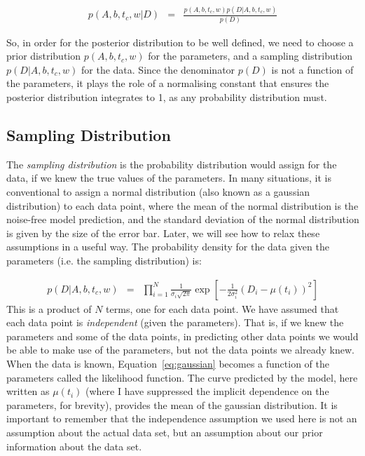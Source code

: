 \begin{eqnarray}
p(A, b, t_c, w | D) &=& \frac{p(A, b, t_c, w)p(D | A, b, t_c, w)}{p(D)}
\end{eqnarray}

So, in order for the posterior distribution to be well defined, we need to
choose a prior distribution $p(A, b, t_c, w)$ for the parameters, and a
sampling distribution $p(D | A, b, t_c, w)$ for the data. Since the denominator
$p(D)$ is not a function of the parameters, it plays the role of a normalising
constant that ensures the posterior distribution integrates to 1, as any
probability distribution must.

\subsection{Sampling Distribution}
The {\it sampling distribution} is the probability distribution would assign
for the data, if we knew the true values of the parameters.
In many situations, it is conventional to assign a normal distribution
(also known as a gaussian distribution) to each data point, where the mean
of the normal distribution is the noise-free model prediction, and the
standard deviation of the normal distribution is given by the size of the
error bar. Later, we will see how to relax these assumptions in a useful way.
The probability density for the data given the parameters (i.e. the sampling
distribution) is:

\begin{eqnarray}
p(D | A, b, t_c, w) &=& \prod_{i=1}^N \frac{1}{\sigma_i \sqrt{2\pi}}
\exp\left[-\frac{1}{2\sigma_i^2}\left(D_i - \mu(t_i)\right)^2\right]\label{eq:gaussian}
\end{eqnarray}
This is a product of $N$ terms, one for each data point. We have assumed that
each data point is {\it independent} (given the parameters). That is, if we
knew the parameters and some of the data points, in predicting other data points
we would be able to make use of the parameters, but not the data points we
already knew. When the data is known, Equation~\ref{eq:gaussian} becomes a
function of the parameters called the likelihood function. The curve predicted
by the model, here written as $\mu(t_i)$ (where I have suppressed the implicit
dependence on the parameters, for brevity), provides the mean of the gaussian
distribution. It is important to remember that the independence assumption we
used here is not an assumption about the actual data set, but an assumption
about our prior information about the data set.

